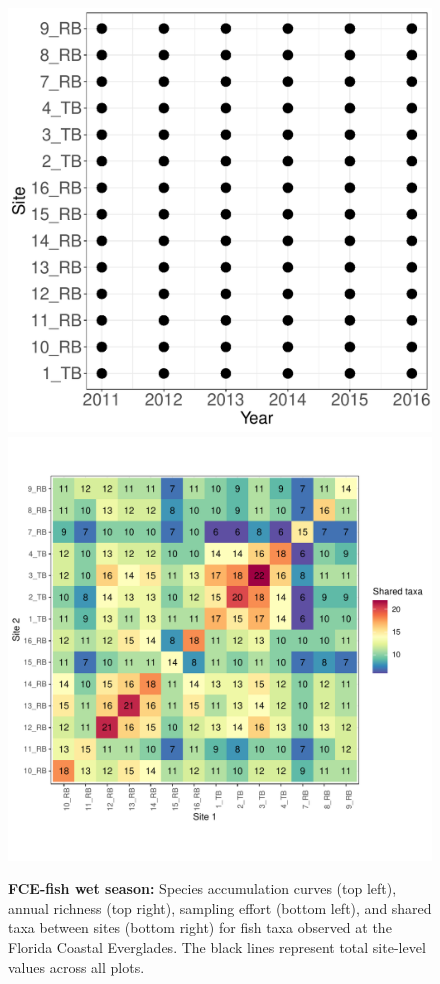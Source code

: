 \documentclass[11pt, oneside]{article}
\begin{document}
\begin{figure}[h!]
\includegraphics[scale = 0.4]{fce-fish-RehageWet_spatiotemporal_sampling_effort.pdf}
\includegraphics[scale = 0.4]{fce-fish-RehageWet_spp_shared.pdf}
\caption{{\bf FCE-fish wet season:} Species accumulation curves (top left),  annual richness (top right), sampling effort (bottom left), and shared taxa between sites (bottom right) for fish taxa observed at the Florida Coastal Everglades. The black lines represent total site-level values across all plots.}
\label{fce-fish-wet}
\end{figure}
\end{document}
